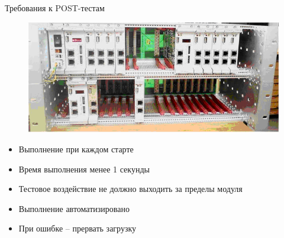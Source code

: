 \documentclass[unicode, notheorems]{beamer}
\begin{document}
\begin{frame}{Требования к POST-тестам}
\begin{figure}[h]
\begin{center}
	\includegraphics[width=0.8\columnwidth]{AS}
\end{center}
\end{figure}
\begin{itemize}
 \item Выполнение при каждом старте
 \item Время выполнения менее 1 секунды
 \item Тестовое воздействие не должно выходить за пределы модуля
 \item Выполнение автоматизировано
 \item При ошибке -- прервать загрузку
\end{itemize}
\end{frame}
\end{document}
